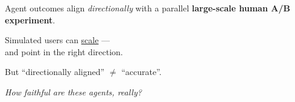 \begin{frame}[standout]
  Agent outcomes align \emph{directionally} with a parallel
  \textbf{large-scale human A/B experiment}.
\end{frame}

\begin{frame}[standout]
  Simulated users can \ul{scale} --- \\ and point in the right direction.
  \vspace{10pt}
  \pause

  But ``directionally aligned'' $\neq$ ``accurate''.
  \vspace{4pt}

  \emph{How faithful are these agents, really?}
\end{frame}
